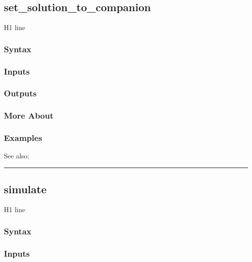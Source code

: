 \documentclass[letterpaper,10pt,english]{sphinxmanual}
\begin{document}
\subsection{set\_solution\_to\_companion}
\label{classes/models/@dsge/dsge:id155}\label{classes/models/@dsge/dsge:set-solution-to-companion}
H1 line


\subsubsection{Syntax}
\label{classes/models/@dsge/dsge:id156}

\subsubsection{Inputs}
\label{classes/models/@dsge/dsge:id157}

\subsubsection{Outputs}
\label{classes/models/@dsge/dsge:id158}

\subsubsection{More About}
\label{classes/models/@dsge/dsge:id159}

\subsubsection{Examples}
\label{classes/models/@dsge/dsge:id160}
See also:


\bigskip\hrule{}\bigskip



\subsection{simulate}
\label{classes/models/@dsge/dsge:id161}\label{classes/models/@dsge/dsge:simulate}
H1 line


\subsubsection{Syntax}
\label{classes/models/@dsge/dsge:id162}

\subsubsection{Inputs}
\label{classes/models/@dsge/dsge:id163}
\end{document}
